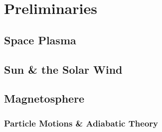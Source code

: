 \chapter{Preliminaries}\label{chapter:preliminaries}

\section{Space Plasma}\label{sec:plasma}

\section{Sun \& the Solar Wind}\label{sec:solar}

\section{Magnetosphere}\label{sec:mag}

\subsection{Particle Motions \& Adiabatic Theory}

